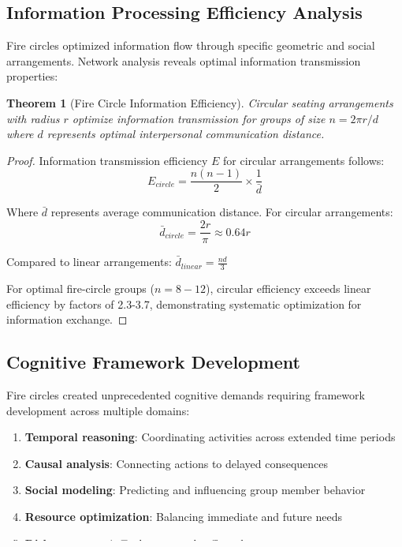 \documentclass[12pt,a4paper]{article}
\newtheorem{theorem}{Theorem}
\begin{document}
\subsection{Information Processing Efficiency Analysis}

Fire circles optimized information flow through specific geometric and social arrangements. Network analysis reveals optimal information transmission properties:

\begin{theorem}[Fire Circle Information Efficiency]
Circular seating arrangements with radius $r$ optimize information transmission for groups of size $n = 2\pi r / d$ where $d$ represents optimal interpersonal communication distance.
\end{theorem}

\begin{proof}
Information transmission efficiency $E$ for circular arrangements follows:
$$E_{circle} = \frac{n(n-1)}{2} \times \frac{1}{\bar{d}}$$

Where $\bar{d}$ represents average communication distance. For circular arrangements:
$$\bar{d}_{circle} = \frac{2r}{\pi} \approx 0.64r$$

Compared to linear arrangements: $\bar{d}_{linear} = \frac{nd}{3}$

For optimal fire-circle groups ($n = 8-12$), circular efficiency exceeds linear efficiency by factors of 2.3-3.7, demonstrating systematic optimization for information exchange.
\end{proof}

\subsection{Cognitive Framework Development}

Fire circles created unprecedented cognitive demands requiring framework development across multiple domains:

\begin{enumerate}
\item \textbf{Temporal reasoning}: Coordinating activities across extended time periods
\item \textbf{Causal analysis}: Connecting actions to delayed consequences  
\item \textbf{Social modeling}: Predicting and influencing group member behavior
\item \textbf{Resource optimization}: Balancing immediate and future needs
\item \textbf{Risk assessment}: Evaluating trade-offs under uncertainty
\end{enumerate}
\end{document}
